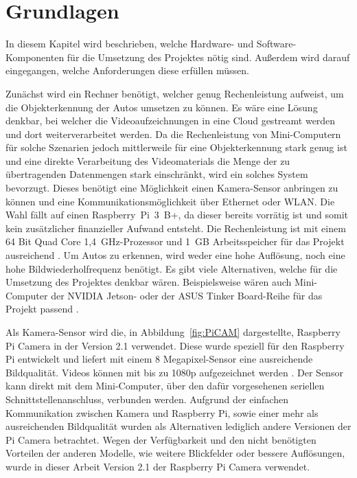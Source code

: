 \section{Grundlagen}\label{ch:Grundlagen}
In diesem Kapitel wird beschrieben, welche Hardware- und Software-Komponenten für die Umsetzung des Projektes nötig sind.
Außerdem wird darauf eingegangen, welche Anforderungen diese erfüllen müssen.

Zunächst wird ein Rechner benötigt, welcher genug Rechenleistung aufweist, um die Objekt\-erkennung der Autos umsetzen zu können.
Es wäre eine Lösung denkbar, bei welcher die Videoaufzeichnungen in eine Cloud gestreamt werden und dort weiterverarbeitet werden.
Da die Rechenleistung von Mini-Computern für solche Szenarien jedoch mittlerweile für eine Objekterkennung stark genug ist und eine direkte Verarbeitung des Videomaterials die Menge der zu übertragenden Datenmengen stark einschränkt, wird ein solches System bevorzugt.
Dieses benötigt eine Möglichkeit einen Kamera-Sensor anbringen zu können und eine Kommunikationsmöglichkeit über Ethernet oder WLAN.
Die Wahl fällt auf einen Raspberry~Pi~3~B+, da dieser bereits vorrätig ist und somit kein zusätzlicher finanzieller Aufwand entsteht.
Die Rechenleistung ist mit einem 64 Bit Quad Core 1,4~GHz-Prozessor und 1~GB Arbeitsspeicher für das Projekt ausreichend \cite{pi3}.
Um Autos zu erkennen, wird weder eine hohe Auflösung, noch eine hohe Bildwiederholfrequenz benötigt.
Es gibt viele Alternativen, welche für die Umsetzung des Projektes denkbar wären.
Beispielsweise wären auch Mini-Computer der NVIDIA Jetson- oder der ASUS Tinker Board-Reihe für das Projekt passend \cite{jetson} \cite{tinkerBoard}.

Als Kamera-Sensor wird die, in Abbildung~\ref{fig:PiCAM} dargestellte, Raspberry Pi Camera in der Version 2.1 verwendet.
Diese wurde speziell für den Raspberry Pi entwickelt und liefert mit einem 8 Megapixel-Sensor eine ausreichende Bildqualität.
Videos können mit bis zu 1080p aufgezeichnet werden \cite{piCAM}.
Der Sensor kann direkt mit dem Mini-Computer, über den dafür vorgesehenen seriellen Schnittstellenanschluss, verbunden werden.
Aufgrund der einfachen Kommunikation zwischen Kamera und Raspberry Pi, sowie einer mehr als ausreichenden Bildqualität wurden als Alternativen lediglich andere Versionen der Pi Camera betrachtet.
Wegen der Verfügbarkeit und den nicht benötigten Vorteilen der anderen Modelle, wie weitere Blickfelder oder bessere Auflösungen, wurde in dieser Arbeit Version 2.1 der Raspberry Pi Camera verwendet.

